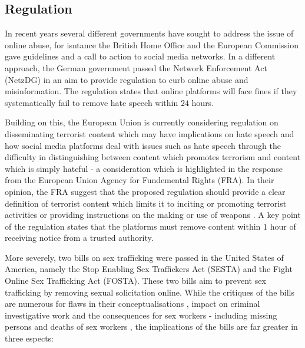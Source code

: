 
\subsection{Regulation} 
In recent years several different governments have sought to address the issue of online abuse, for isntance the British Home Office \citep{HomeOffice:2016} and the European Commission \citep{EUCommission:2016} gave guidelines and a call to action to social media networks. In a different approach, the German government passed the Network Enforcement Act (NetzDG) \citep{NetzDG:2017} in an aim to provide regulation to curb online abuse and misinformation. The regulation states that online platforms will face fines if they systematically fail to remove hate speech within $24$ hours.\vspace{5mm}

Building on this, the European Union is currently considering regulation on disseminating terrorist content which may have implications on hate speech and how social media platforms deal with issues such as hate speech \citep{EUCommission:2018} through the difficulty in distinguishing between content which promotes terrorism and content which is simply hateful - a consideration which is highlighted in the response from the European Union Agency for Fundemental Rights (FRA). In their opinion, the FRA suggest that the proposed regulation should provide a clear definition of terrorist content which limits it to inciting or promoting terrorist activities or providing instructions on the making or use of weapons \citep{FRA:2019}. A key point of the regulation states that the platforms must remove content within $1$ hour of receiving notice from a trusted authority.\vspace{5mm}

More severely, two bills on sex trafficking were passed in the United States of America, namely the Stop Enabling Sex Traffickers Act (SESTA) and the Fight Online Sex Trafficking Act (FOSTA). These two bills aim to prevent sex trafficking by removing sexual solicitation online. While the critiques of the bills are numerous for flaws in their conceptualisations \citep{Romano:2018}, impact on criminal investigative work \citep{Q:2018} and the consequences for sex workers - including missing persons and deaths of sex workers \citep{Blue:2018,Simon:2018}, the implications of the bills are far greater in three espects:

